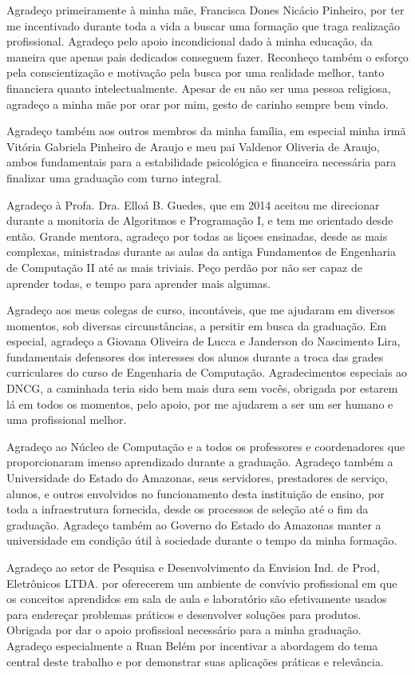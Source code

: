 Agradeço primeiramente à minha mãe, Francisca Dones Nicácio Pinheiro, por ter me incentivado durante toda a vida a buscar uma formação que traga realização profissional. Agradeço pelo apoio incondicional dado à minha educação, da maneira que apenas pais dedicados conseguem fazer. Reconheço também o esforço pela conscientização e motivação pela busca por uma realidade melhor, tanto financiera quanto intelectualmente. Apesar de eu não ser uma pessoa religiosa, agradeço a minha mãe por orar por mim, gesto de carinho sempre bem vindo.

Agradeço também aos outros membros da minha família, em especial minha irmã Vitória Gabriela Pinheiro de Araujo e meu pai Valdenor Oliveria de Araujo, ambos fundamentais para a estabilidade psicológica e financeira necessária para finalizar uma graduação com turno integral.

Agradeço à Profa. Dra. Elloá B. Guedes, que em 2014 aceitou me direcionar durante a monitoria de Algoritmos e Programação I, e tem me orientado desde então. Grande mentora, agradeço por todas as liçoes ensinadas, desde as mais complexas, ministradas durante as aulas da antiga Fundamentos de Engenharia de Computação II até as mais triviais. Peço perdão por não ser capaz de aprender todas, e tempo para aprender mais algumas.

Agradeço aos meus colegas de curso, incontáveis, que me ajudaram em diversos momentos, sob diversas circunstâncias, a persitir em busca da graduação. Em especial, agradeço a Giovana Oliveira de Lucca e Janderson do Nascimento Lira, fundamentais defensores dos interesses dos alunos durante a troca das grades curriculares do curso de Engenharia de Computação. Agradecimentos especiais ao DNCG, a caminhada teria sido bem mais dura sem vocês, obrigada por estarem lá em todos os momentos, pelo apoio, por me ajudarem a ser um ser humano e uma profissional melhor.

Agradeço ao Núcleo de Computação e a todos os professores e coordenadores que proporcionaram imenso aprendizado durante a graduação. Agradeço também a Universidade do Estado do Amazonas, seus servidores, prestadores de serviço, alunos, e outros envolvidos no funcionamento desta instituição de ensino, por toda a infraestrutura fornecida, desde os processos de seleção até o fim da graduação. Agradeço também ao Governo do Estado do Amazonas manter a universidade em condição útil à sociedade durante o tempo da minha formação.

Agradeço ao setor de Pesquisa e Desenvolvimento da Envision Ind. de Prod, Eletrônicos LTDA. por oferecerem um ambiente de convívio profissional em que os conceitos aprendidos em sala de aula e laboratório são efetivamente usados para endereçar problemas práticos e desenvolver soluções para produtos. Obrigada por dar o apoio profissioal necessário para a minha graduação. Agradeço especialmente a Ruan Belém por incentivar a abordagem do tema central deste trabalho e por demonstrar suas aplicações práticas e relevância.

